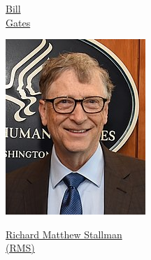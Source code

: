 \vfill\null
\pagebreak



\LARGE

\begin{multicols}{3}


	\begin{center}
		\href{https://pt.wikipedia.org/wiki/Bill_Gates}{Bill\\ Gates}
		
		\includegraphics[width=.8\columnwidth]{./IMG-GIT/bill.jpg}
	\end{center}

\vfill\null
\columnbreak

	\begin{center}
		\href{https://pt.wikipedia.org/wiki/Richard_Matthew_Stallman}{Richard Matthew Stallman \\(RMS)}
		

\end{center}
\end{multicols}
